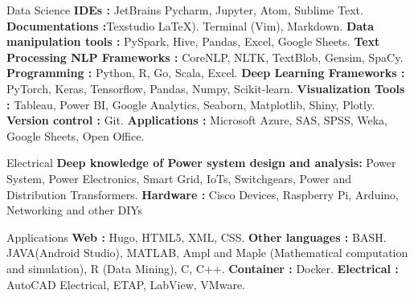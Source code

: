


\begin{cvskills}




\cvskill
{Data Science} %
{\textbf{IDEs :} JetBrains Pycharm, Jupyter, Atom, Sublime Text.
\textbf{Documentations :}Texstudio \LaTeX).  Terminal (Vim), Markdown.\newline
\textbf{Data manipulation tools :} PySpark, Hive, Pandas, Excel, Google Sheets. 
\textbf{Text Processing NLP Frameworks :} CoreNLP, NLTK, TextBlob, Gensim, SpaCy. 
\textbf{Programming :} Python, R, Go, Scala, Excel. 
\textbf{Deep Learning Frameworks :} PyTorch, Keras, Tensorflow, Pandas, Numpy, Scikit-learn. \textbf{Visualization Tools :} Tableau, Power BI, Google Analytics, Seaborn, Matplotlib, Shiny, Plotly.		\newline
\textbf{Version control :} Git.
\textbf{Applications :} Microsoft Azure, SAS, SPSS, Weka, Google Sheets, Open Office.} %


\cvskill
{Electrical} %
{\textbf{Deep knowledge of Power system design and analysis:} Power System, Power Electronics, Smart Grid, IoTs, Switchgears, Power and Distribution Transformers.
\newline \textbf{Hardware :} Cisco Devices, Raspberry Pi, Arduino, Networking and other DIYs } %



\cvskill
{Applications} %
{\textbf{Web :} Hugo, HTML5, XML, CSS. \newline 
\textbf{Other languages :} BASH. JAVA(Android Studio), MATLAB, Ampl and Maple (Mathematical computation and simulation), R (Data Mining), C, C++. 
\textbf{Container :} Docker. \textbf{Electrical :} AutoCAD Electrical, ETAP, LabView, VMware.} %


\end{cvskills}
